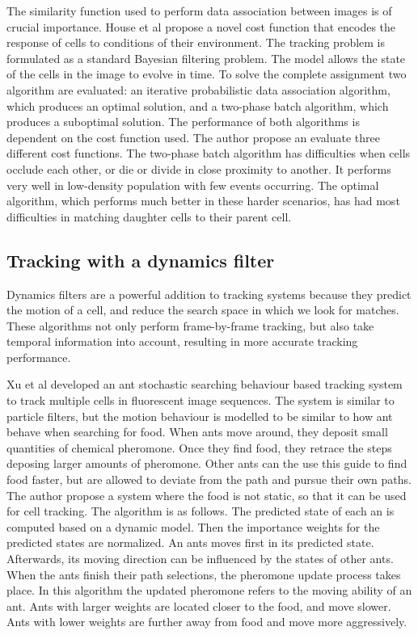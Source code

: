 \documentclass[12pt,a4paper,openany]{book}
\begin{document}
The similarity function used to perform data association between images is of crucial importance. House et al \cite{house09} propose a novel cost function that encodes the response of cells to conditions of their environment. The tracking problem is formulated as a standard Bayesian filtering problem. The model allows the state of the cells in the image to evolve in time. To solve the complete assignment two algorithm are evaluated: an iterative probabilistic data association algorithm, which produces an optimal solution, and a two-phase batch algorithm, which produces a suboptimal solution. The performance of both algorithms is dependent on the cost function used. The author propose an evaluate three different cost functions. The two-phase batch algorithm has difficulties when cells occlude each other, or die or divide in close proximity to another. It performs very well in low-density population with few events occurring. The optimal algorithm, which performs much better in these harder scenarios, has had most difficulties in matching daughter cells to their parent cell.


\subsection{Tracking with a dynamics filter}

Dynamics filters are a powerful addition to tracking systems because they predict the motion of a cell, and reduce the search space in which we look for matches. These algorithms not only perform frame-by-frame tracking, but also take temporal information into account, resulting in more accurate tracking performance.

Xu et al \cite{xu12} developed an ant stochastic searching behaviour based tracking system to track multiple cells in fluorescent image sequences. The system is similar to particle filters, but the motion behaviour is modelled to be similar to how ant behave when searching for food. When ants move around, they deposit small quantities of chemical pheromone. Once they find food, they retrace the steps deposing larger amounts of pheromone. Other ants can the use this guide to find food faster, but are allowed to deviate from the path and pursue their own paths. The author propose a system where the food is not static, so that it can be used for cell tracking. The algorithm is as follows. The predicted state of each an is computed based on a dynamic model. Then the importance weights for the predicted states are normalized. An ants moves first in its predicted state. Afterwards, its moving direction can be influenced by the states of other ants. When the ants finish their path selections, the pheromone update process takes place. In this algorithm the updated pheromone refers to the moving ability of an ant. Ants with larger weights are located closer to the food, and move slower. Ants with lower weights are further away from food and move more aggressively.
\end{document}
